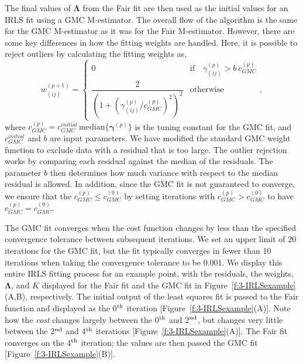 The final values of $\bm{\Lambda}$ from the Fair fit are then used as the initial values for an IRLS fit using a GMC M-estimator.
The overall flow of the algorithm is the same for the GMC M-estimator as it was for the Fair M-estimator.
However, there are some key differences in how the fitting weights are handled.
Here, it is possible to reject outliers by calculating the fitting weights as,
\begin{equation}
  w_{(ij)}^{(p+1)} =
\begin{cases}
0 & \text{if} \quad \gamma_{(ij)}^{(p)} > b \ c_{GMC}^{(p)} \\
 \dfrac{2}{(1+(\gamma_{(ij)}^{(p)} / c_{GMC}^{(p)})^2)^2} & \text{otherwise}
\end{cases},
\end{equation}
where $c_{GMC}^{(p)} = c_{GMC}^{initial} \, \textrm{median}\{ \bm{\gamma}^{(p)} \}$ is the tuning constant for the GMC fit, and $c_{GMC}^{initial}$ and $b$ are input parameters.
We have modified the standard GMC weight function to exclude data with a residual that is too large.
The outlier rejection works by comparing each residual against the median of the residuals.
The parameter $b$ then determines how much variance with respect to the median residual is allowed.
In addition, since the GMC fit is not guaranteed to converge, we ensure that the $c_{GMC}^{(p)} \leq c_{GMC}^{(0)}$ by setting iterations with $c_{GMC}^{(p)} > c_{GMC}^{(0)}$ to have $c_{GMC}^{(p)} = c_{GMC}^{(0)}$.

The GMC fit converges when the cost function changes by less than the specified convergence tolerance between subsequent iterations.
We set an upper limit of 20 iterations for the GMC fit, but the fit typically converges in fewer than 10 iterations when taking the convergence tolerance to be 0.001.
We display this entire IRLS fitting process for an example point, with the residuals, the weights, $\bm{\Lambda}$, and $K$ displayed for the Fair fit and the GMC fit in Figure~\ref{f:3-IRLSexample}(A,B), respectively.
The initial output of the least squares fit is passed to the Fair function and displayed as the 0$^{\rm th}$ iteration [Figure~\ref{f:3-IRLSexample}(A)].
Note how the {\it cost} changes largely between the 0$^{\rm th}$ and 2$^{\rm nd}$, but changes very little between the 2$^{\rm nd}$ and 4$^{\rm th}$ iterations [Figure~\ref{f:3-IRLSexample}(A)].
The Fair fit converges on the 4$^{\rm th}$ iteration; the values are then passed the GMC fit [Figure~\ref{f:3-IRLSexample}(B)].

